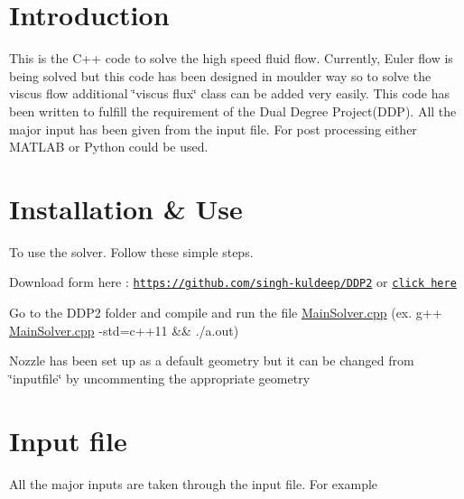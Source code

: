 \hypertarget{index_intro_sec}{}\section{Introduction}\label{index_intro_sec}
This is the C++ code to solve the high speed fluid flow. Currently, Euler flow is being solved but this code has been designed in moulder way so to solve the viscus flow additional \char`\"{}viscus flux\char`\"{} class can be added very easily. This code has been written to fulfill the requirement of the Dual Degree Project(\+D\+D\+P). All the major input has been given from the input file. For post processing either M\+A\+T\+L\+AB or Python could be used.\hypertarget{index_install_sec}{}\section{Installation \& Use}\label{index_install_sec}
To use the solver. Follow these simple steps.
\begin{DoxyItemize}
\item Download form here \+: \href{https://github.com/singh-kuldeep/DDP2}{\tt https\+://github.\+com/singh-\/kuldeep/\+D\+D\+P2} or \href{https://github.com/singh-kuldeep/DDP2}{\tt click here}
\item Go to the D\+D\+P2 folder and compile and run the file \hyperlink{MainSolver_8cpp}{Main\+Solver.\+cpp} (ex. g++ \hyperlink{MainSolver_8cpp}{Main\+Solver.\+cpp} -\/std=c++11 \&\& ./a.out)
\item Nozzle has been set up as a default geometry but it can be changed from \char`\"{}inputfile\char`\"{} by uncommenting the appropriate geometry
\end{DoxyItemize}\hypertarget{index_input}{}\section{Input file}\label{index_input}
All the major inputs are taken through the input file. For example



